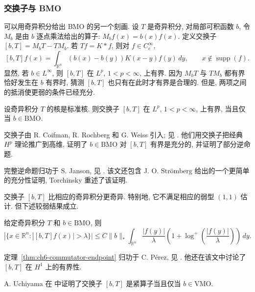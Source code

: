 \subsubsection{交换子与 BMO}
\label{subsec:ch6-commutators-bmo}

可以用奇异积分给出 BMO 的另一个刻画. 设 $T$ 是奇异积分, 对局部可积函数 $b$, 令 $M_b$ 是由 $b$ 逐点乘法给出的算子: $M_bf(x)=b(x)f(x)$. 定义交换子 $[b,T]=M_bT-TM_b$. 若 $Tf=K*f$, 则对 $f\in C_c^\infty$,
\[
 [b,T]f(x)=\int_{\mathbb R^n}(b(x)-b(y))K(x-y)f(y)\,dy,
 \qquad x\notin\operatorname{supp}(f).
\]
显然, 若 $b\in L^\infty$, 则 $[b,T]$ 在 $L^p$, $1<p<\infty$, 上有界. 因为 $M_bT$ 与 $TM_b$ 都有界恰好发生在 $b$ 有界时, 猜测 $[b,T]$ 也只有在此时才有界是合理的. 但是, 两项之间的抵消使更弱的条件已经充分.

\begin{Theorem}
\label{thm:ch6-commutator-bmo-characterization}
设奇异积分 $T$ 的核是标准核. 则交换子 $[b,T]$ 在 $L^p$, $1<p<\infty$, 上有界, 当且仅当 $b\in\mathrm{BMO}$.
\end{Theorem}

交换子由 R. Coifman, R. Rochberg 和 G. Weiss 引入; 见 . 他们用交换子把经典 $H^p$ 理论推广到高维, 证明了 $b\in\mathrm{BMO}$ 对 $[b,T]$ 有界是充分的, 并证明了部分逆命题.

\hypertarget{chapter-06-page-144}{}
完整逆命题归功于 S. Janson, 见 . 该文还包含 J. O. Strömberg 给出的一个更简单的充分性证明, Torchinsky  重述了该证明.

交换子 $[b,T]$ 比相应的奇异积分更奇异. 特别地, 它不满足相应的弱型 $(1,1)$ 估计. 但下述较弱结果成立.

\begin{Theorem}
\label{thm:ch6-commutator-endpoint}
给定奇异积分 $T$ 和 $b\in\mathrm{BMO}$, 则
\[
 |\{x\in\mathbb R^n:|[b,T]f(x)|>\lambda\}|
 \le C\|b\|_*\int_{\mathbb R^n}\frac{|f(y)|}{\lambda}
 \left(1+\log^+\left(\frac{|f(y)|}{\lambda}\right)\right)\,dy.
\]
\end{Theorem}

定理~\ref{thm:ch6-commutator-endpoint} 归功于 C. Pérez, 见 . 他还在该文中讨论了 $[b,T]$ 在 $H^1$ 上的有界性.

A. Uchiyama 在  中证明了交换子 $[b,T]$ 是紧算子当且仅当 $b\in\mathrm{VMO}$.
